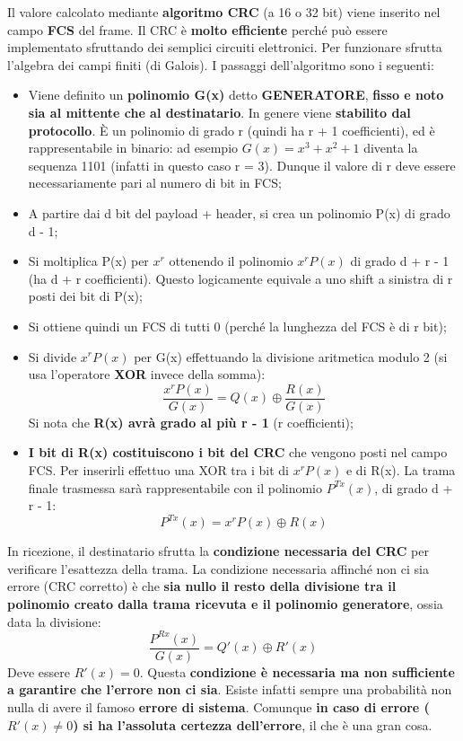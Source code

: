 \documentclass[12pt]{article}
\begin{document}
Il valore calcolato mediante \textbf{algoritmo CRC} (a 16 o 32 bit) viene inserito nel campo \textbf{FCS} del frame. Il CRC è \textbf{molto efficiente} perché può essere implementato sfruttando dei semplici circuiti elettronici. Per funzionare sfrutta l'algebra dei campi finiti (di Galois). I passaggi dell'algoritmo sono i seguenti:
\begin{itemize}
    \item Viene definito un \textbf{polinomio G(x)} detto \textbf{GENERATORE}, \textbf{fisso e noto sia al mittente che al destinatario}. In genere viene \textbf{stabilito dal protocollo}. È un polinomio di grado r (quindi ha r + 1 coefficienti), ed è rappresentabile in binario: ad esempio $G(x) = x^3 + x^2 + 1$ diventa la sequenza 1101 (infatti in questo caso r = 3). Dunque il valore di r deve essere necessariamente pari al numero di bit in FCS;
    \item A partire dai d bit del payload + header, si crea un polinomio P(x) di grado d - 1;
    \item Si moltiplica P(x) per $x^r$ ottenendo il polinomio $x^rP(x)$ di grado d + r - 1 (ha d + r coefficienti). Questo logicamente equivale a uno shift a sinistra di r posti dei bit di P(x);
    \item Si ottiene quindi un FCS di tutti 0 (perché la lunghezza del FCS è di r bit);
    \item Si divide $x^rP(x)$ per G(x) effettuando la divisione aritmetica modulo 2 (si usa l'operatore \textbf{XOR} invece della somma):
    \begin{equation*}
        \frac{x^rP(x)}{G(x)} = Q(x) \oplus \frac{R(x)}{G(x)}
    \end{equation*}
    Si nota che \textbf{R(x) avrà grado al più r - 1} (r coefficienti);
    \item \textbf{I bit di R(x) costituiscono i bit del CRC} che vengono posti nel campo FCS. Per inserirli effettuo una XOR tra i bit di $x^rP(x)$ e di R(x). La trama finale trasmessa sarà rappresentabile con il polinomio $P^{Tx}(x)$, di grado d + r - 1:
    \begin{equation*}
        P^{Tx}(x) = x^rP(x) \oplus R(x)
    \end{equation*}
\end{itemize}
In ricezione, il destinatario sfrutta la \textbf{condizione necessaria del CRC} per verificare l'esattezza della trama. La condizione necessaria affinché non ci sia errore (CRC corretto) è che \textbf{sia nullo il resto della divisione tra il polinomio creato dalla trama ricevuta e il polinomio generatore}, ossia data la divisione:
\begin{equation*}
    \frac{P^{Rx}(x)}{G(x)} = Q'(x) \oplus R'(x)
\end{equation*}
Deve essere $R'(x) = 0$. Questa \textbf{condizione è necessaria ma non sufficiente a garantire che l'errore non ci sia}. Esiste infatti sempre una probabilità non nulla di avere il famoso \textbf{errore di sistema}. Comunque \textbf{in caso di errore ($R'(x) \neq 0$) si ha l'assoluta certezza dell'errore}, il che è una gran cosa.
\end{document}
